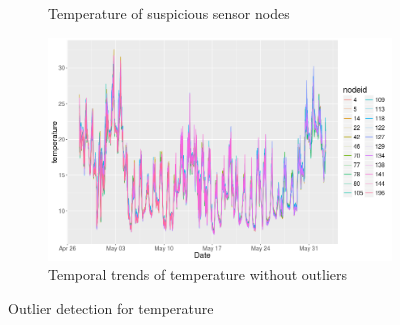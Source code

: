 \documentclass[11pt]{article}
\begin{document}
{\begin{figure}[H]
\begin{subfigure}{.5\textwidth}
\caption{Temperature of suspicious sensor nodes}
\label{fig:fewtemp}
\end{subfigure}%
\begin{subfigure}{.5\textwidth}
\centering
\includegraphics[width=0.88\linewidth]{temp_normal.png}
\caption{Temporal trends of temperature without outliers}
\label{fig:tempnormal}
\end{subfigure}
\caption{Outlier detection for temperature}
\end{figure}%
}
\end{document}
